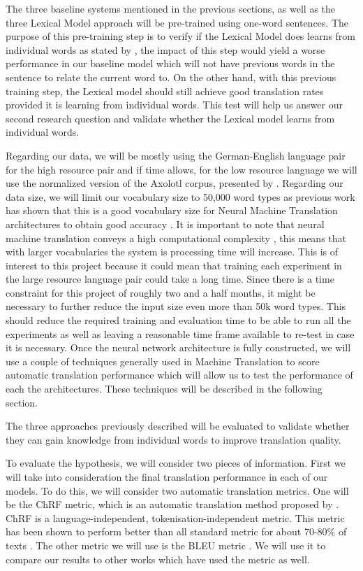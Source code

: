  
 The three baseline systems mentioned in the previous sections, as well as the three Lexical Model approach will be pre-trained using one-word sentences. The purpose of this pre-training step is to verify if the Lexical Model does learns from individual words as stated by \citet{DBLP:journals/corr/abs-1710-01329}, the impact of this step would yield a worse performance in our baseline model which will not have previous words in the sentence to relate the current word to. On the other hand, with this previous training step, the Lexical model should still achieve good translation rates provided it is learning from individual words. This test will help us answer our second research question and validate whether the Lexical model learns from individual words.

 Regarding our data, we will be mostly using the German-English language pair for the high resource pair and if time allows, for the low resource language we will use the normalized version of the Axolotl corpus, presented by \citet*{gutierrez2016axolotl}. Regarding our data size, we will limit our vocabulary size to 50,000 word types as previous work has shown that this is a good vocabulary size for Neural Machine Translation architectures to obtain good accuracy \citep*{DBLP:journals/corr/LHostisGA16}. It is important to note that neural machine translation conveys a high computational complexity \citep{DBLP:journals/corr/MiWI16}, this means that with larger vocabularies the system is processing time will increase. This is of interest to this project because it could mean that training each experiment in the large resource language pair could take a long time. Since there is a time constraint for this project of roughly two and a half months, it might be necessary to further reduce the input size even more than 50k word types. This should reduce the required training and evaluation time to be able to run all the experiments as well as leaving a reasonable time frame available to re-test in case it is necessary.
Once the neural network architecture is fully constructed, we will use a couple of techniques generally used in Machine Translation to score automatic translation performance which will allow us to test the performance of each the architectures. These techniques will be described in the following section.

The three approaches previously described will be evaluated to validate whether they can gain knowledge from individual words to improve translation quality. 

To evaluate the hypothesis, we will consider two pieces of information. First we will take into consideration the final translation performance in each of our models. To do this, we will consider two automatic translation metrics. One will be the ChRF metric, which is an automatic translation method proposed by \citet*{popovic2015chrf}. ChRF is a language-independent, tokenisation-independent metric. This metric  has been shown to perform better than all standard metric for about 70-80$\%$ of texts \citep{popovic2015chrf}. The other metric we will use is the BLEU metric \citep*{Papineni02bleu:a}. We will use it to compare our results to other works which have used the metric as well.

